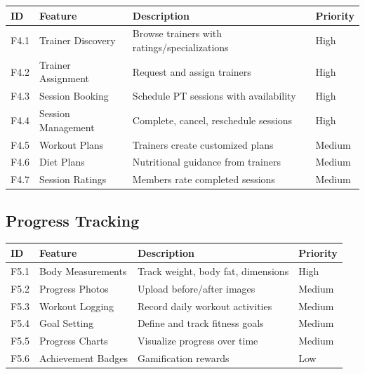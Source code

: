 \documentclass[
  12pt,
  a4paperpaper,
]{report}
\newcounter{none} %
\begin{document}
{\def\LTcaptype{none} %
\begin{longtable}[]{@{}
  >{\raggedright\arraybackslash}p{}
  >{\raggedright\arraybackslash}p{}
  >{\raggedright\arraybackslash}p{}
  >{\raggedright\arraybackslash}p{}@{}}
\hline
\begin{minipage}[b]{\linewidth}\raggedright
ID
\end{minipage} & \begin{minipage}[b]{\linewidth}\raggedright
Feature
\end{minipage} & \begin{minipage}[b]{\linewidth}\raggedright
Description
\end{minipage} & \begin{minipage}[b]{\linewidth}\raggedright
Priority
\end{minipage} \\
\hline
\endhead
\hline
\endlastfoot
F4.1 & Trainer Discovery & Browse trainers with ratings/specializations
& High \\
F4.2 & Trainer Assignment & Request and assign trainers & High \\
F4.3 & Session Booking & Schedule PT sessions with availability &
High \\
F4.4 & Session Management & Complete, cancel, reschedule sessions &
High \\
F4.5 & Workout Plans & Trainers create customized plans & Medium \\
F4.6 & Diet Plans & Nutritional guidance from trainers & Medium \\
F4.7 & Session Ratings & Members rate completed sessions & Medium \\
\end{longtable}
}

\subsection{Progress Tracking}
\label{progress-tracking-1}

{\def\LTcaptype{none} %
\begin{longtable}[]{@{}llll@{}}
\hline
ID & Feature & Description & Priority \\
\hline
\endhead
\hline
\endlastfoot
F5.1 & Body Measurements & Track weight, body fat, dimensions & High \\
F5.2 & Progress Photos & Upload before/after images & Medium \\
F5.3 & Workout Logging & Record daily workout activities & Medium \\
F5.4 & Goal Setting & Define and track fitness goals & Medium \\
F5.5 & Progress Charts & Visualize progress over time & Medium \\
F5.6 & Achievement Badges & Gamification rewards & Low \\
\end{longtable}
}
\end{document}
